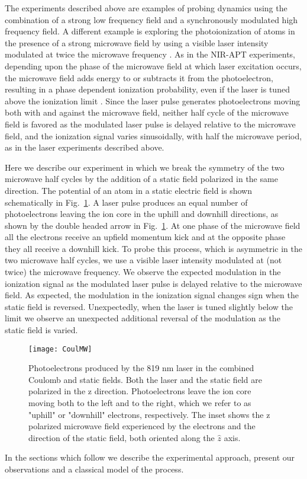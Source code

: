 \documentclass[aps,pra,reprint,groupedaddress]{revtex4-1}
\begin{document}
The experiments described above are examples of probing dynamics using the combination of a strong low frequency field and a synchronously modulated high frequency field. A different example is exploring the photoionization of atoms in the presence of a strong microwave field by using a visible laser intensity modulated at twice the microwave frequency \cite{Carrat}. As in the NIR-APT experiments, depending upon the phase of the microwave field at which laser excitation occurs, the microwave field adds energy to or subtracts it from the photoelectron, resulting in a phase dependent ionization probability, even if the laser is tuned above the ionization limit \cite{Shuman}. Since the laser pulse generates photoelectrons moving both with and against the microwave field, neither half cycle of the microwave field is favored as the modulated laser pulse is delayed relative to the microwave field, and the ionization signal varies sinusoidally, with half the microwave period, as in the laser experiments described above.

Here we describe our experiment in which we break the symmetry of the two microwave half cycles by the addition of a static field polarized in the same direction. The potential of an atom in a static electric field is shown schematically in Fig.~\ref{fig:CoulMW}. A laser pulse produces an equal number of photoelectrons leaving the ion core in the uphill and downhill directions, as shown by the double headed arrow in Fig.~\ref{fig:CoulMW}. At one phase of the microwave field all the electrons receive an upfield momentum kick and at the opposite phase they all receive a downhill kick. To probe this process, which is asymmetric in the two microwave half cycles, we use a visible laser intensity modulated at (not twice) the microwave frequency. We observe the expected modulation in the ionization signal as the modulated laser pulse is delayed relative to the microwave field. As expected, the modulation in the ionization signal changes sign when the static field is reversed. Unexpectedly, when the laser is tuned slightly below the limit we observe an unexpected additional reversal of the modulation as the static field is varied.

\begin{figure}
	\texttt{[image: CoulMW]}
	\caption{Photoelectrons produced by the 819 nm laser in the combined Coulomb and static fields. Both the laser and the static field are polarized in the z direction. Photoelectrons leave the ion core moving both to the left and to the right, which we refer to as "uphill" or "downhill" electrons, respectively. The inset shows the z polarized microwave field experienced by the electrons and the direction of the static field, both oriented along the $\hat{z}$ axis.}
	\label{fig:CoulMW}
\end{figure}
In the sections which follow we describe the experimental approach, present our observations and a classical model of the process.
\end{document}
